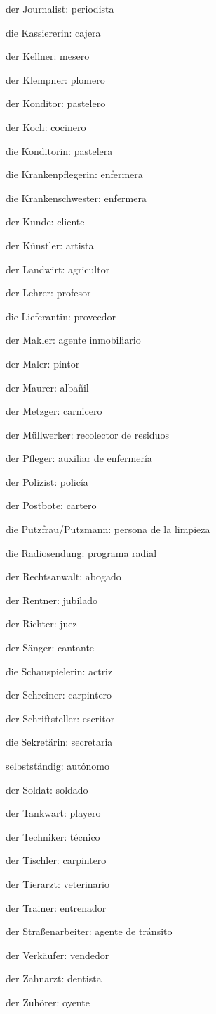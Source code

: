 \begin{multicols}{2}
\begin{myitemize}
\item der Journalist: periodista
\item die Kassiererin: cajera
\item der Kellner: mesero
\item der Klempner: plomero
\item der Konditor: pastelero
\item der Koch: cocinero
\item die Konditorin: pastelera
\item die Krankenpflegerin: enfermera
\item die Krankenschwester: enfermera
\item der Kunde: cliente
\item der Künstler: artista
\item der Landwirt: agricultor
\item der Lehrer: profesor
\item die Lieferantin: proveedor
\item der Makler: agente inmobiliario
\item der Maler: pintor
\item der Maurer: albañil
\item der Metzger: carnicero
\item der Müllwerker: recolector de residuos
\item der Pfleger: auxiliar de enfermería
\item der Polizist: policía
\item der Postbote: cartero
\item die Putzfrau/Putzmann: persona de la limpieza
\item die Radiosendung: programa radial
\item der Rechtsanwalt: abogado
\item der Rentner: jubilado
\item der Richter: juez
\item der Sänger: cantante
\item die Schauspielerin: actriz
\item der Schreiner: carpintero
\item der Schriftsteller: escritor
\item die Sekretärin: secretaria
\item selbstständig: autónomo
\item der Soldat: soldado
\item der Tankwart: playero
\item der Techniker: técnico
\item der Tischler: carpintero
\item der Tierarzt: veterinario
\item der Trainer: entrenador
\item der Straßenarbeiter: agente de tránsito
\item der Verkäufer: vendedor
\item der Zahnarzt: dentista
\item der Zuhörer: oyente
\end{myitemize}
\end{multicols}

